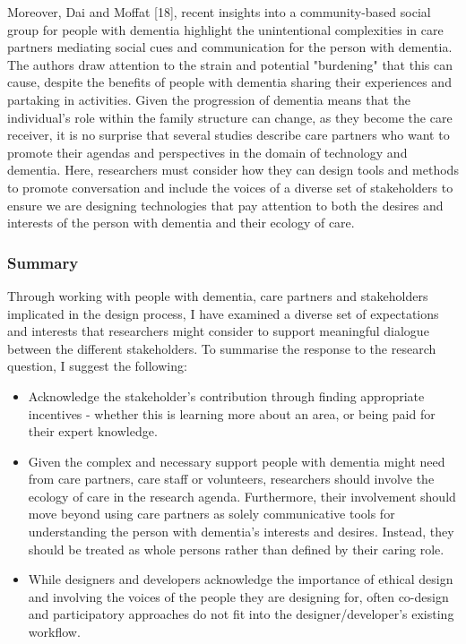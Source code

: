 Moreover, Dai and Moffat [18], recent insights into a community-based social group for people with dementia highlight the unintentional complexities in care partners mediating social cues and communication for the person with dementia. The authors draw attention to the strain and potential "burdening" that this can cause, despite the benefits of people with dementia sharing their experiences and partaking in activities. Given the progression of dementia means that the individual's role within the family structure can change, as they become the care receiver, it is no surprise that several studies describe care partners who want to promote their agendas and perspectives in the domain of technology and dementia. Here, researchers must consider how they can design tools and methods to promote conversation and include the voices of a diverse set of stakeholders to ensure we are designing technologies that pay attention to both the desires and interests of the person with dementia and their ecology of care.

\subsubsection{Summary}
\label{RQ3-summary}
Through working with people with dementia, care partners and stakeholders implicated in the design process, I have examined a diverse set of expectations and interests that researchers might consider to support meaningful dialogue between the different stakeholders. To summarise the response to the research question, I  suggest the following:
\begin{itemize}
    \item Acknowledge the stakeholder's contribution through finding appropriate incentives - whether this is learning more about an area, or being paid for their expert knowledge.
    \item Given the complex and necessary support people with dementia might need from care partners, care staff or volunteers, researchers should involve the ecology of care in the research agenda. Furthermore, their involvement should move beyond using care partners as solely communicative tools for understanding the person with dementia's interests and desires. Instead, they should be treated as whole persons rather than defined by their caring role.
    \item While designers and developers acknowledge the importance of ethical design and involving the voices of the people they are designing for, often co-design and participatory approaches do not fit into the designer/developer's existing workflow.

\end{itemize}




